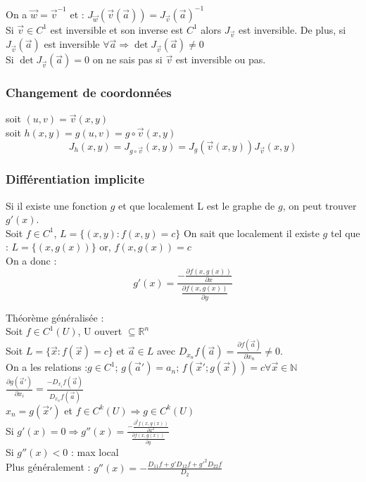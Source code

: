 \documentclass[../main.tex]{subfiles}
\begin{document}
On a $\vec{w} = \vec{v}^{-1}$ et : $J_{\vec{w}}(\vec{v}(\vec{a})) = J_{\vec{v}}(\vec{a})^{-1}$\\
Si $\vec{v} \in C^1$ est inversible et son inverse est $C^1$ alors $J_{\vec{v}}$ est inversible. De plus, si $J_{\vec{v}}(\vec{a})$ est inversible $\forall \vec{a} \Rightarrow \det J_{\vec{v}}(\vec{a}) \neq 0$\\

Si $\det J_{\vec{v}}(\vec{a}) = 0$ on ne sais pas si $\vec{v}$ est inversible ou pas.\\

\subsubsection{Changement de coordonnées}
soit $(u,v) = \vec{v}(x,y)$\\
soit $h(x,y) = g(u,v) = g\circ \vec{v} (x,y)$\\
\begin{equation}
    J_h(x,y) = J_{g\circ \vec{v}} (x,y) = J_g(\vec{v}(x,y)) J_{\vec{v}}(x,y)
\end{equation}

\subsubsection{Différentiation implicite}
Si il existe une fonction $g$ et que localement L est le graphe de $g$, on peut trouver $g'(x)$.\\
Soit $f\in C^1$, $L=\{(x,y) : f(x,y)=c\}$ On sait que localement il existe $g$ tel que : $L=\{(x,g(x))\}$ or, $f(x,g(x)) = c$\\
On a donc :\\
\begin{equation}
    g'(x) = \frac{-\frac{\partial f(x,g(x))}{\partial x}}{\frac{\partial f(x,g(x))}{\partial y}}
\end{equation}

\begin{theorem}Théorème généralisée :\\
Soit $f\in C^1(U)$, U ouvert $\subseteq \mathbb{R}^n$\\
Soit $L= \{\vec{x} : f(\vec{x}) = c\}$ et $\vec{a} \in L$ avec $D_{x_n} f(\vec{a}) = \frac{\partial f(\vec{a})}{\partial x_n} \neq 0$.\\

On a les relations :$g\in C^1$; $g(\vec{a}') = a_n$; $f(\vec{x}'; g(\vec{x})) = c \forall \vec{x} \in \mathbb{N}$\\
$\frac{\partial g(\vec{a}')}{\partial x_i} = \frac{-D_{x_i} f(\vec{a})}{D_{x_n} f(\vec{a})}$\\

$x_n = g(\vec{x}')$ et $f\in C^k(U) \Rightarrow g\in C^k (U)$\\

Si $g'(x) = 0\Rightarrow g''(x) = \frac{-\frac{\partial^2 f(x, g(x))}{\partial x^2}}{\frac{\partial f(x, g(x))}{\partial y}}$ \\
Si $g''(x) < 0$ : max local\\
Plus généralement : $g''(x) = -\frac{D_{11}f + g' D_{12}f+ g'^2D_{22}f}{D_2}$
\end{theorem}
\end{document}
